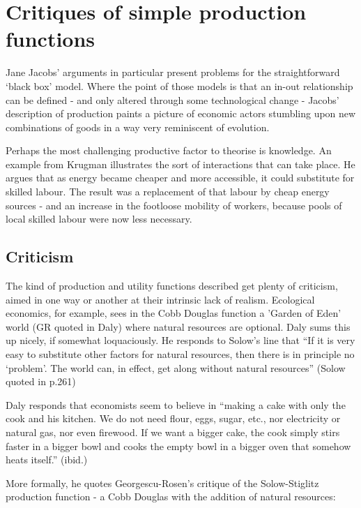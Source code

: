 \section{Critiques of simple production functions \label{prodfuncts}}

Jane Jacobs' arguments in particular present problems for the straightforward  `black box' model. Where the point of those models is that an in-out relationship can be defined - and only altered through some technological change - Jacobs' description of production paints a picture of economic actors stumbling upon new combinations of goods in a way very reminiscent of evolution. 

Perhaps the most challenging productive factor to theorise is knowledge. An example from Krugman illustrates the sort of interactions that can take place. He argues that as energy became cheaper and more accessible, it could substitute for skilled labour. The result was a replacement of that labour by cheap energy sources - and an increase in the footloose mobility of workers, because pools of local skilled labour were now less necessary. 

\subsection{Criticism}

The kind of production and utility functions described get plenty  of criticism, aimed in one way or another at their intrinsic lack of realism. Ecological economics, for example, sees in the Cobb Douglas function a 'Garden of Eden' world (GR quoted in Daly) where natural resources are optional. Daly sums this up nicely, if somewhat loquaciously. He responds to Solow's line that ``If it is very easy to substitute other factors for natural resources, then there is in principle no `problem'. The world can, in effect, get along without natural resources'' (Solow quoted in \citealt{daly_georgescu-roegen_1997} p.261)

Daly responds that economists seem to believe in ``making a cake with only the cook and his kitchen. We do not need flour, eggs, sugar, etc., nor electricity or natural gas, nor even firewood. If we want a bigger cake, the cook simply stirs faster in a bigger bowl and cooks the empty bowl in a bigger oven that somehow heats itself.'' (ibid.) 

More formally, he quotes Georgescu-Rosen's critique of the Solow-Stiglitz production function - a Cobb Douglas with the addition of natural resources: 

